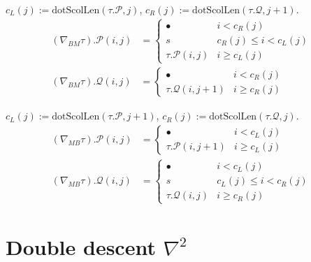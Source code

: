 \begin{definition}[B $\to$ M paints]
  \label{def:descentPaint_BM}
  \leanok
  $c_L(j) := \mathrm{dotScolLen}(\tau.\mathcal{P}, j)$, $c_R(j) := \mathrm{dotScolLen}(\tau.\mathcal{Q}, j + 1)$.
  \begin{align*}
    (\nabla_{BM}\tau).\mathcal{P}(i, j) &= \begin{cases} \bullet & i < c_R(j) \\ s & c_R(j) \leq i < c_L(j) \\ \tau.\mathcal{P}(i, j) & i \geq c_L(j) \end{cases} \\
    (\nabla_{BM}\tau).\mathcal{Q}(i, j) &= \begin{cases} \bullet & i < c_R(j) \\ \tau.\mathcal{Q}(i, j + 1) & i \geq c_R(j) \end{cases}
  \end{align*}
\end{definition}

\begin{definition}[M $\to$ B paints]
  \label{def:descentPaint_MB}
  \leanok
  $c_L(j) := \mathrm{dotScolLen}(\tau.\mathcal{P}, j + 1)$, $c_R(j) := \mathrm{dotScolLen}(\tau.\mathcal{Q}, j)$.
  \begin{align*}
    (\nabla_{MB}\tau).\mathcal{P}(i, j) &= \begin{cases} \bullet & i < c_L(j) \\ \tau.\mathcal{P}(i, j+1) & i \geq c_L(j) \end{cases} \\
    (\nabla_{MB}\tau).\mathcal{Q}(i, j) &= \begin{cases} \bullet & i < c_L(j) \\ s & c_L(j) \leq i < c_R(j) \\ \tau.\mathcal{Q}(i, j) & i \geq c_R(j) \end{cases}
  \end{align*}
\end{definition}

\section{Double descent $\nabla^2$}

